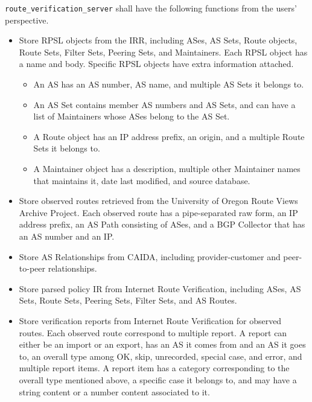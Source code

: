 \documentclass[12pt]{article}
\begin{document}
\verb|route_verification_server| shall have the following functions from
the users' perspective.

\begin{itemize}
    \item Store RPSL objects from the IRR,
    including ASes, AS Sets, Route objects, Route Sets, Filter Sets,
    Peering Sets, and Maintainers.
    Each RPSL object has a name and body.
    Specific RPSL objects have extra information attached.
    \begin{itemize}
        \item An AS has an AS number, AS name, and
        multiple AS Sets it belongs to.
        \item An AS Set contains member AS numbers and AS Sets, and
        can have a list of Maintainers whose ASes belong to the AS Set.
        \item A Route object has an IP address prefix, an origin, and
        a multiple Route Sets it belongs to.
        \item A Maintainer object has a description,
        multiple other Maintainer names that maintains it,
        date last modified, and source database.
    \end{itemize}
    \item Store observed routes retrieved from the University of
    Oregon Route Views Archive Project.
    Each observed route has a pipe-separated raw form,
    an IP address prefix, an AS Path consisting of ASes,
    and a BGP Collector that has an AS number and an IP.
    \item Store AS Relationships from CAIDA,
    including provider-customer and peer-to-peer relationships.
    \item Store parsed policy IR from Internet Route Verification,
    including ASes, AS Sets, Route Sets, Peering Sets, Filter Sets, and
    AS Routes.
    \item Store verification reports from Internet Route Verification for
    observed routes.
    Each observed route correspond to multiple report.
    A report can either be an import or an export,
    has an AS it comes from and an AS it goes to,
    an overall type among OK, skip, unrecorded, special case, and error,
    and multiple report items.
    A report item has a category corresponding to
    the overall type mentioned above,
    a specific case it belongs to,
    and may have a string content or a number content associated to it.

\end{itemize}
\end{document}
